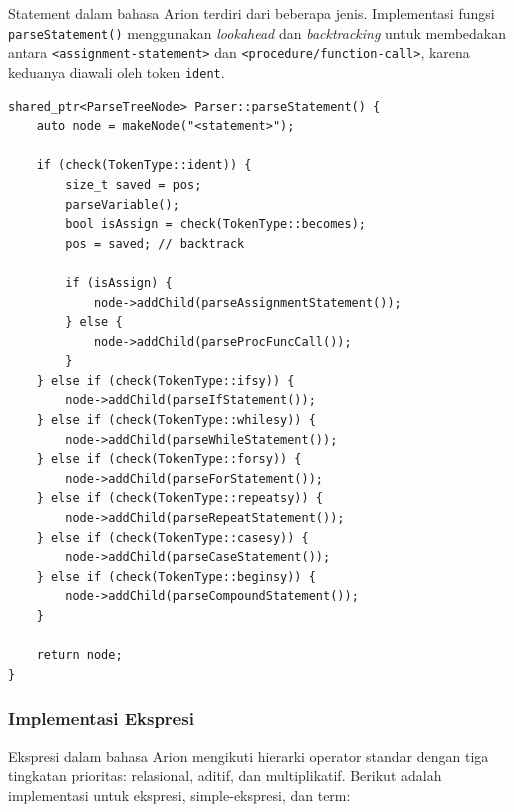 ﻿\documentclass[12pt,a4paper]{article}
\begin{document}
Statement dalam bahasa Arion terdiri dari beberapa jenis. Implementasi fungsi \texttt{parseStatement()} menggunakan \textit{lookahead} dan \textit{backtracking} untuk membedakan antara \texttt{<assignment-statement>} dan \texttt{<procedure/function-call>}, karena keduanya diawali oleh token \texttt{ident}.

\begin{lstlisting}[style=cpp, caption={Implementasi parsing statement}]
shared_ptr<ParseTreeNode> Parser::parseStatement() {
    auto node = makeNode("<statement>");

    if (check(TokenType::ident)) {
        size_t saved = pos;
        parseVariable();
        bool isAssign = check(TokenType::becomes);
        pos = saved; // backtrack

        if (isAssign) {
            node->addChild(parseAssignmentStatement());
        } else {
            node->addChild(parseProcFuncCall());
        }
    } else if (check(TokenType::ifsy)) {
        node->addChild(parseIfStatement());
    } else if (check(TokenType::whilesy)) {
        node->addChild(parseWhileStatement());
    } else if (check(TokenType::forsy)) {
        node->addChild(parseForStatement());
    } else if (check(TokenType::repeatsy)) {
        node->addChild(parseRepeatStatement());
    } else if (check(TokenType::casesy)) {
        node->addChild(parseCaseStatement());
    } else if (check(TokenType::beginsy)) {
        node->addChild(parseCompoundStatement());
    }

    return node;
}
\end{lstlisting}

\subsubsection{Implementasi Ekspresi}

Ekspresi dalam bahasa Arion mengikuti hierarki operator standar dengan tiga tingkatan prioritas: relasional, aditif, dan multiplikatif. Berikut adalah implementasi untuk ekspresi, simple-ekspresi, dan term:
\end{document}
